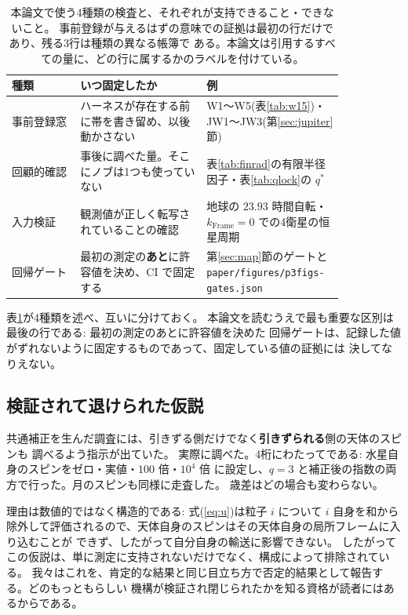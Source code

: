 \documentclass[a4paper,10pt,twocolumn]{ltjsarticle}
\begin{document}
\begin{table}[t]
\centering
\caption{本論文で使う4種類の検査と、それぞれが支持できること・できないこと。
  事前登録が与えるはずの意味での証拠は最初の行だけであり、残る3行は種類の異なる帳簿で
  ある。本論文は引用するすべての量に、どの行に属するかのラベルを付けている。}
\label{tab:checkkinds}
{\small\setlength{\tabcolsep}{3pt}
\begin{tabular}{p{0.19\linewidth}p{0.35\linewidth}p{0.30\linewidth}}
\toprule
種類 & いつ固定したか & 例 \\
\midrule
事前登録窓 &
  ハーネスが存在する前に帯を書き留め、以後動かさない &
  W1〜W5(表\ref{tab:w15})・JW1〜JW3(第\ref{sec:jupiter}節) \\
回顧的確認 &
  事後に調べた量。そこにノブは1つも使っていない &
  表\ref{tab:finrad}の有限半径因子・表\ref{tab:qlock}の $q^{*}$ \\
入力検証 &
  観測値が正しく転写されていることの確認 &
  地球の $23.93$ 時間自転・$k_{\mathrm{Frame}}{=}0$ での4衛星の恒星周期 \\
回帰ゲート &
  最初の測定の\textbf{あと}に許容値を決め、CI で固定する &
  第\ref{sec:map}節のゲートと
  \texttt{paper/\allowbreak figures/\allowbreak p3figs-\allowbreak gates.json} \\
\bottomrule
\end{tabular}}
\end{table}

表\ref{tab:checkkinds}が4種類を述べ、互いに分けておく。
本論文を読むうえで最も重要な区別は最後の行である: 最初の測定のあとに許容値を決めた
回帰ゲートは、記録した値がずれないように固定するものであって、固定している値の証拠には
決してなりえない。

\subsection{検証されて退けられた仮説}
\label{sec:p4spin}

共通補正を生んだ調査には、引きずる側だけでなく\textbf{引きずられる}側の天体のスピンも
調べるよう指示が出ていた。
実際に調べた。4桁にわたってである: 水星自身のスピンをゼロ・実値・$100$ 倍・$10^{4}$ 倍
に設定し、$q=3$ と補正後の指数の両方で行った。月のスピンも同様に走査した。
歳差はどの場合も変わらない。

理由は数値的ではなく構造的である: 式(\ref{eq:u})は粒子 $i$ について $i$ 自身を和から
除外して評価されるので、天体自身のスピンはその天体自身の局所フレームに入り込むことが
できず、したがって自分自身の輸送に影響できない。
したがってこの仮説は、単に測定に支持されないだけでなく、構成によって排除されている。
我々はこれを、肯定的な結果と同じ目立ち方で否定的結果として報告する。どのもっともらしい
機構が検証され閉じられたかを知る資格が読者にはあるからである。
\end{document}
